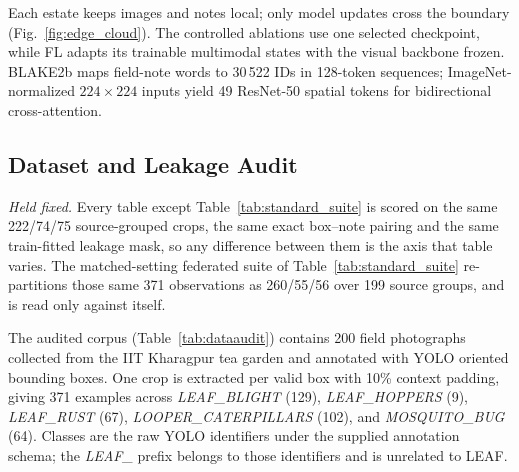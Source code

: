\documentclass[conference]{IEEEtran}
\begin{document}
Each estate keeps images and notes local; only model updates cross the
boundary (Fig.~\ref{fig:edge_cloud}).
The controlled ablations use one selected checkpoint, while FL adapts its
trainable multimodal states with the visual backbone frozen. BLAKE2b maps
field-note words to 30\,522 IDs in 128-token sequences; ImageNet-normalized
$224{\times}224$ inputs yield 49 ResNet-50 spatial tokens for bidirectional
cross-attention.

\subsection{Dataset and Leakage Audit}
\label{sec:dataset}

\emph{Held fixed.} Every table except Table~\ref{tab:standard_suite} is scored
on the same 222/74/75 source-grouped crops, the same exact box--note pairing and
the same train-fitted leakage mask, so any difference between them is the axis
that table varies. The matched-setting
federated suite of Table~\ref{tab:standard_suite} re-partitions those same 371
observations as 260/55/56 over 199 source groups, and is read only against itself.

The audited corpus (Table~\ref{tab:dataaudit}) contains 200 field
photographs collected from the IIT
Kharagpur tea garden and annotated with YOLO oriented bounding boxes. One crop
is extracted per valid box with 10\% context padding,
giving 371 examples across \textit{LEAF\_BLIGHT} (129),
\textit{LEAF\_HOPPERS} (9), \textit{LEAF\_RUST} (67),
\textit{LOOPER\_CATERPILLARS} (102), and \textit{MOSQUITO\_BUG} (64).
Classes are the raw YOLO identifiers under the supplied annotation schema; the \textit{LEAF\_} prefix belongs to those identifiers and is unrelated to LEAF.
\end{document}
